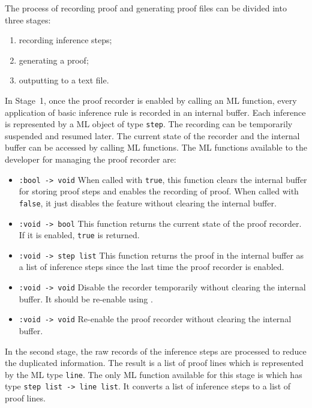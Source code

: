 The process of recording proof and
generating proof files can be divided into three stages: 
\begin{enumerate}
\item recording inference steps;
\item generating a proof;
\item outputting to a text file.
\end{enumerate}
In Stage~1, once the proof recorder is enabled by calling an ML function,
every application of basic inference rule is recorded in an internal
buffer. Each inference is represented by a ML object of type {\tt step}.
The recording can be temporarily suspended and resumed later. The
current state of the recorder and the internal buffer can be accessed
by calling ML functions. The ML functions available to the developer
for managing the proof recorder are:
\begin{itemize}
\item {} \verb|:bool -> void|\newline
When called with {\tt true}, this function clears the internal buffer
for storing proof steps and enables 
the recording of proof. When called with {\tt false}, it just disables the
feature without clearing the internal buffer.
\item {} \verb|:void -> bool|\newline
This function returns the current state of the proof recorder.
If it is enabled, {\tt true} is returned.
\item {} \verb|:void -> step list|\newline
This function returns the proof in the internal buffer as a list of
inference steps since the last time the proof recorder is enabled.
\item {} \verb|:void -> void|\newline
Disable the recorder temporarily without clearing the internal buffer.
It should be re-enable using .
\item {} \verb|:void -> void|\newline
Re-enable the proof recorder without clearing the internal buffer.
\end{itemize}

In the second stage, the raw records of the inference steps are
processed to reduce the duplicated information. The result is a list
of proof lines which is represented by the ML type {\tt line}.
The only ML function available for this stage is 
which has type \verb|step list -> line list|. It converts a list of
inference steps to a list of proof lines.

